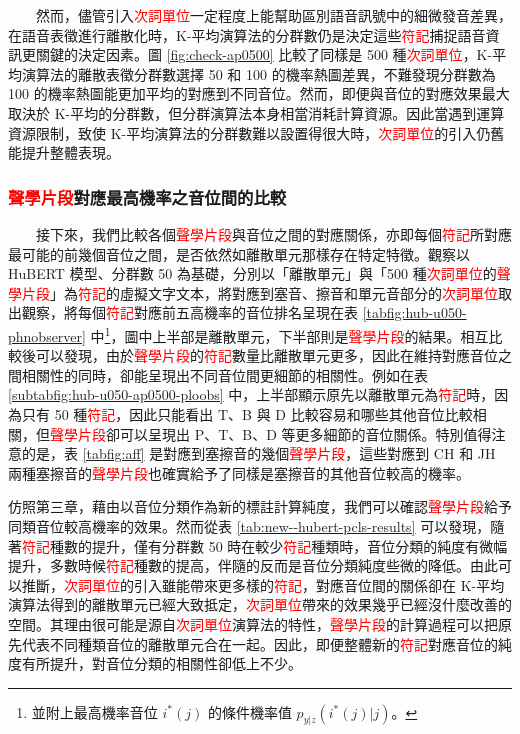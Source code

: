 　　然而，儘管引入\textcolor{red}{次詞單位}一定程度上能幫助區別語音訊號中的細微發音差異，在語音表徵進行離散化時，K-平均演算法的分群數仍是決定這些\textcolor{red}{符記}捕捉語音資訊更關鍵的決定因素。圖 \ref{fig:check-ap0500} 比較了同樣是 500 種\textcolor{red}{次詞單位}，K-平均演算法的離散表徵分群數選擇 50 和 100 的機率熱圖差異，不難發現分群數為 100 的機率熱圖能更加平均的對應到不同音位。然而，即便與音位的對應效果最大取決於 K-平均的分群數，但分群演算法本身相當消耗計算資源。因此當遇到運算資源限制，致使 K-平均演算法的分群數難以設置得很大時，\textcolor{red}{次詞單位}的引入仍舊能提升整體表現。

\subsubsection{\textcolor{red}{聲學片段}對應最高機率之音位間的比較}

　　接下來，我們比較各個\textcolor{red}{聲學片段}與音位之間的對應關係，亦即每個\textcolor{red}{符記}所對應最可能的前幾個音位之間，是否依然如離散單元那樣存在特定特徵。觀察以 HuBERT 模型、分群數 50 為基礎，分別以「離散單元」與「500 種\textcolor{red}{次詞單位}的\textcolor{red}{聲學片段}」為\textcolor{red}{符記}的虛擬文字文本，將對應到塞音、擦音和單元音部分的\textcolor{red}{次詞單位}取出觀察，將每個\textcolor{red}{符記}對應前五高機率的音位排名呈現在表 \ref{tabfig:hub-u050-phnobserver} 中\footnote{並附上最高機率音位 $i^*(j)$ 的條件機率值 $p_{y|z}(i^*(j)|j)$。}，圖中上半部是離散單元，下半部則是\textcolor{red}{聲學片段}的結果。相互比較後可以發現，由於\textcolor{red}{聲學片段}的\textcolor{red}{符記}數量比離散單元更多，因此在維持對應音位之間相關性的同時，卻能呈現出不同音位間更細節的相關性。例如在表 \ref{subtabfig:hub-u050-ap0500-ploobs} 中，上半部顯示原先以離散單元為\textcolor{red}{符記}時，因為只有 50 種\textcolor{red}{符記}，因此只能看出 T、B 與 D 比較容易和哪些其他音位比較相關，但\textcolor{red}{聲學片段}卻可以呈現出 P、T、B、D 等更多細節的音位關係。特別值得注意的是，表 \ref{tabfig:aff} 是對應到塞擦音的幾個\textcolor{red}{聲學片段}，這些對應到 CH 和 JH 兩種塞擦音的\textcolor{red}{聲學片段}也確實給予了同樣是塞擦音的其他音位較高的機率。

        仿照第三章，藉由以音位分類作為新的標註計算純度，我們可以確認\textcolor{red}{聲學片段}給予同類音位較高機率的效果。然而從表 \ref{tab:new--hubert-pcls-results} 可以發現，隨著\textcolor{red}{符記}種數的提升，僅有分群數 50 時在較少\textcolor{red}{符記}種類時，音位分類的純度有微幅提升，多數時候\textcolor{red}{符記}種數的提高，伴隨的反而是音位分類純度些微的降低。由此可以推斷，\textcolor{red}{次詞單位}的引入雖能帶來更多樣的\textcolor{red}{符記}，對應音位間的關係卻在 K-平均演算法得到的離散單元已經大致抵定，\textcolor{red}{次詞單位}帶來的效果幾乎已經沒什麼改善的空間。其理由很可能是源自\textcolor{red}{次詞單位}演算法的特性，\textcolor{red}{聲學片段}的計算過程可以把原先代表不同種類音位的離散單元合在一起。因此，即便整體新的\textcolor{red}{符記}對應音位的純度有所提升，對音位分類的相關性卻低上不少。

